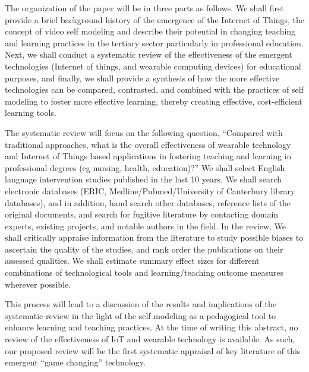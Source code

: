 The organization of the paper will be in three parts as follows. We shall first provide a brief background history of the emergence of the Internet of Things, the concept of video self modeling and describe their potential in changing teaching and learning practices in the tertiary sector particularly in professional education. Next, we shall conduct a systematic review of the effectiveness of the emergent technologies (Internet of things, and wearable computing devices) for educational purposes, and finally, we shall provide a synthesis of how the more effective technologies can be compared, contrasted, and combined with the practices of self modeling to foster more effective learning, thereby creating effective, cost-efficient learning tools.

The systematic review will focus on the following question, “Compared with traditional approaches, what is the overall effectiveness of wearable technology and Internet of Things based applications in fostering teaching and learning in professional degrees (eg nursing, health, education)?” We shall select English language intervention studies published in the last 10 years. We shall search electronic databases (ERIC, Medline/Pubmed/University of Canterbury library databases), and in addition, hand search other databases, reference lists of the original documents, and search for fugitive literature by contacting domain experts, existing projects, and notable authors in the field. In the review, We shall critically appraise information from the literature to study possible biases to ascertain the quality of the studies, and rank order the publications on their assessed qualities. We shall estimate summary effect sizes for different combinations of technological tools and learning/teaching outcome measures wherever possible.

This process will lead to a discussion of the results and implications of the systematic review in the light of the self modeling as a pedagogical tool to enhance learning and teaching practices.
At the time of writing this abstract, no review of the effectiveness of IoT and wearable technology is available. As such, our proposed review will be the first systematic appraisal of key literature of this emergent “game changing” technology.
